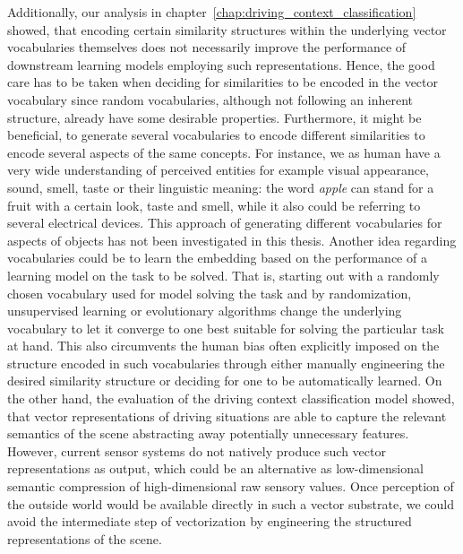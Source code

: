 Additionally, our analysis in chapter~\ref{chap:driving_context_classification} showed, that encoding certain similarity structures within the underlying vector vocabularies themselves does not necessarily improve the performance of downstream learning models employing such representations.
Hence, the good care has to be taken when deciding for similarities to be encoded in the vector vocabulary since random vocabularies, although not following an inherent structure, already have some desirable properties.
Furthermore, it might be beneficial, to generate several vocabularies to encode different similarities to encode several aspects of the same concepts.
For instance, we as human have a very wide understanding of perceived entities for example visual appearance, sound, smell, taste or their linguistic meaning: the word \emph{apple} can stand for a fruit with a certain look, taste and smell, while it also could be referring to several electrical devices.
This approach of generating different vocabularies for aspects of objects has not been investigated in this thesis.
Another idea regarding vocabularies could be to learn the embedding based on the performance of a learning model on the task to be solved.
That is, starting out with a randomly chosen vocabulary used for model solving the task and by randomization, unsupervised learning or evolutionary algorithms change the underlying vocabulary to let it converge to one best suitable for solving the particular task at hand. 
This also circumvents the human bias often explicitly imposed on the structure encoded in such vocabularies through either manually engineering the desired similarity structure or deciding for one to be automatically learned.
On the other hand, the evaluation of the driving context classification model showed, that vector representations of driving situations are able to capture the relevant semantics of the scene abstracting away potentially unnecessary features.
However, current sensor systems do not natively produce such vector representations as output, which could be an alternative as low-dimensional semantic compression of high-dimensional raw sensory values.
Once perception of the outside world would be available directly in such a vector substrate, we could avoid the intermediate step of vectorization by engineering the structured representations of the scene.

